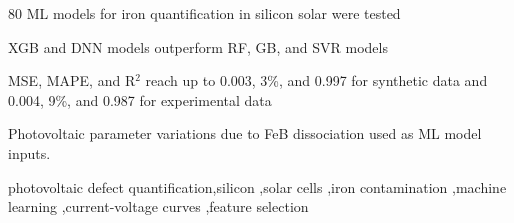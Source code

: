 \documentclass[a4paper,fleqn,draft]{cas-sc}
\begin{document}

\begin{highlights}
\item 80 ML models for iron quantification in silicon solar were tested
\item XGB and DNN  models outperform RF, GB, and SVR models
\item MSE, MAPE, and R$^2$ reach up to 0.003, 3\%, and 0.997 for synthetic data and 0.004, 9\%, and 0.987 for experimental data
\item Photovoltaic parameter variations due to FeB dissociation used as ML model inputs.
\end{highlights}



\begin{keywords}
photovoltaic defect quantification\sep silicon \sep solar cells \sep iron contamination \sep machine learning \sep current-voltage curves \sep feature selection
\end{keywords}


\maketitle

\end{document}
